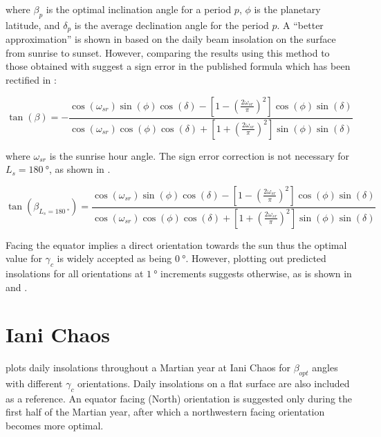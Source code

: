 where $\beta_{p}$ is the optimal inclination angle for a period $p$, $\phi$ is the planetary latitude, and $\delta_{p}$ is the average declination angle for the period $p$. A ``better approximation'' is shown in  based on the daily beam insolation on the surface from sunrise to sunset. However, comparing the results using this method to those obtained with  suggest a sign error in the published formula which has been rectified in :

\begin{equation}
  \label{eq:optimal_tanbeta_insolation}
  \tan{(\beta)} = -\frac{\cos{(\omega_{sr})}\sin{(\phi)}\cos{(\delta)}-\left[1-\left(\frac{2\omega_{sr}}{\pi}\right)^{2}\right]\cos{(\phi)}\sin{(\delta)}}{\cos{(\omega_{sr})}\cos{(\phi)}\cos{(\delta)}+\left[1+\left(\frac{2\omega_{sr}}{\pi}\right)^{2}\right]\sin{(\phi)}\sin{(\delta)}}
\end{equation}


where $\omega_{sr}$ is the sunrise hour angle. The sign error correction is not necessary for $L_{s} = \SI{180}{\degree}$, as shown in .

\begin{equation}
  \label{eq:optimal_tanbeta_insolation_Ls180}
  \tan{(\beta_{L_{s} = \SI{180}{\degree}})} = \frac{\cos{(\omega_{sr})}\sin{(\phi)}\cos{(\delta)}-\left[1-\left(\frac{2\omega_{sr}}{\pi}\right)^{2}\right]\cos{(\phi)}\sin{(\delta)}}{\cos{(\omega_{sr})}\cos{(\phi)}\cos{(\delta)}+\left[1+\left(\frac{2\omega_{sr}}{\pi}\right)^{2}\right]\sin{(\phi)}\sin{(\delta)}}
\end{equation}

Facing the equator implies a direct orientation towards the sun thus the optimal value for $\gamma_{c}$ is widely accepted as being $\SI{0}{\degree}$. However, plotting out predicted insolations for all orientations at $\SI{1}{\degree}$ increments suggests otherwise, as is shown in  and .

\section{Iani Chaos}
\label{sec:Appendix:OptimalAngles:IaniChaos}

 plots daily insolations throughout a Martian year at Iani Chaos for $\beta_{opt}$ angles with different $\gamma_{c}$ orientations. Daily insolations on a flat surface are also included as a reference. An equator facing (North) orientation is suggested only during the first half of the Martian year, after which a northwestern facing orientation becomes more optimal.

